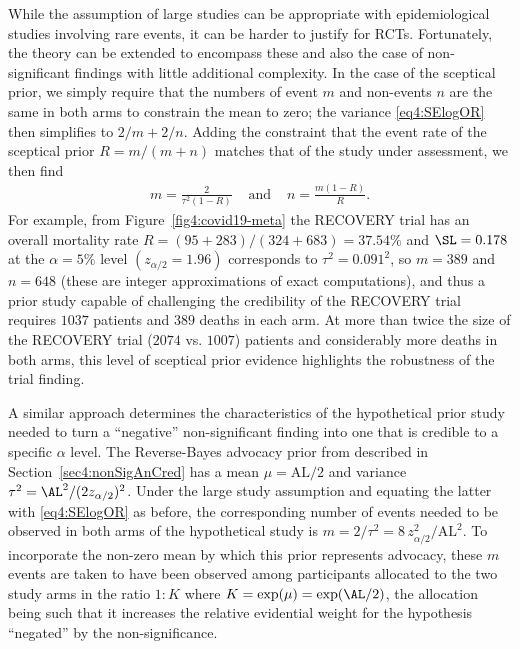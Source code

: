 While the assumption of large studies can be appropriate with epidemiological
studies involving rare events, it can be harder to justify for RCTs.
Fortunately, the theory can be extended to encompass these and also the case of
non-significant findings with little additional complexity. In the case of the
sceptical prior, we simply require that the numbers of event $m$ and non-events
$n$ are the same in both arms to constrain the mean to zero; the variance
\eqref{eq4:SElogOR} then simplifies to $2/m + 2/n$. Adding the constraint that
the event rate of the sceptical prior $R= m /(m + n)$ matches that of the study
under assessment, we then find
\begin{eqnarray*}
  m = \frac{2}{\tau^{2}(1 - R)} & \mbox{ and }
  &n = \frac{m(1 - R)}{R}.
\end{eqnarray*}
For example, from Figure~\ref{fig4:covid19-meta} the RECOVERY trial has an
overall mortality rate $R=(95 + 283)/(324 + 683) = 37.54\%$ and $\SL = 0.178$ at
the $\alpha = 5\%$ level $(z_{\alpha/2} = 1.96)$ corresponds to
$\tau^2=0.091^2$, so $m = 389$ and $n = 648$ (these are integer approximations
of exact computations), and thus a prior study capable of challenging the
credibility of the RECOVERY trial requires $1037$ patients and $389$ deaths in
each arm. At more than twice the size of the RECOVERY trial ($2074$ vs. $1007$)
patients and considerably more deaths in both arms, this level of sceptical
prior evidence highlights the robustness of the trial finding.


A similar approach determines the characteristics of the hypothetical prior
study needed to turn a ``negative'' non-significant finding into one that is
credible to a specific $\alpha$ level. The Reverse-Bayes advocacy prior from
\citet{Matthews2018} described in Section~\ref{sec4:nonSigAnCred} has a mean
$\mu = \mbox{AL}/2$ and variance $\tau^{2} = \AL^2/(2z_{\alpha/2})^2$. Under the
large study assumption and equating the latter with \eqref{eq4:SElogOR} as
before, the corresponding number of events needed to be observed in both arms of
the hypothetical study is $m = 2/\tau^{2} = 8 \, z_{\alpha/2}^2/\mbox{AL}^2$. To
incorporate the non-zero mean by which this prior represents advocacy, these $m$
events are taken to have been observed among participants allocated to the two
study arms in the ratio $1 \colon K$ where $K = \exp(\mu) = \exp(\AL/2)$, the
allocation being such that it increases the relative evidential weight for the
hypothesis ``negated'' by the non-significance.


